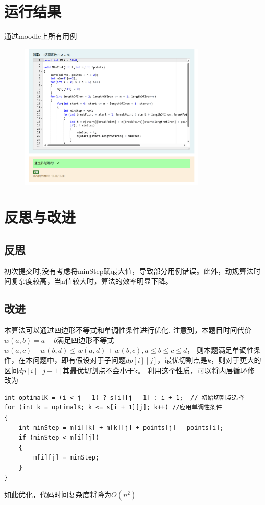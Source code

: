 \documentclass[UTF8]{ctexart}
\begin{document}
\section{运行结果}
通过moodle上所有用例
\begin{figure}[htbp]
    \centering
    \includegraphics[width=0.8\textwidth]{moodle2.png}
\end{figure}

\section{反思与改进}
\subsection{反思}
初次提交时,没有考虑将minStep赋最大值，导致部分用例错误。此外，动规算法时间复杂度较高，当n值较大时，算法的效率明显下降。
\subsection{改进}
本算法可以通过四边形不等式和单调性条件进行优化.
注意到，本题目时间代价$w(a,b) = a - b$满足四边形不等式$w(a,c) + w(b,d) \leq w(a,d) + w(b,c), a \leq b \leq c \leq d$，
则本题满足单调性条件，在本问题中，即有假设对于子问题$dp[i][j]$，最优切割点是$k$，则对于更大的区间$dp[i][j+1]$其最优切割点不会小于k。
利用这个性质，可以将内层循环修改为
\begin{lstlisting}
int optimalK = (i < j - 1) ? s[i][j - 1] : i + 1;  // 初始切割点选择
for (int k = optimalK; k <= s[i + 1][j]; k++) //应用单调性条件
{
    int minStep = m[i][k] + m[k][j] + points[j] - points[i];
    if (minStep < m[i][j]) 
    {
        m[i][j] = minStep;
    }
}
\end{lstlisting}
如此优化，代码时间复杂度将降为$O(n^2)$
\end{document}
